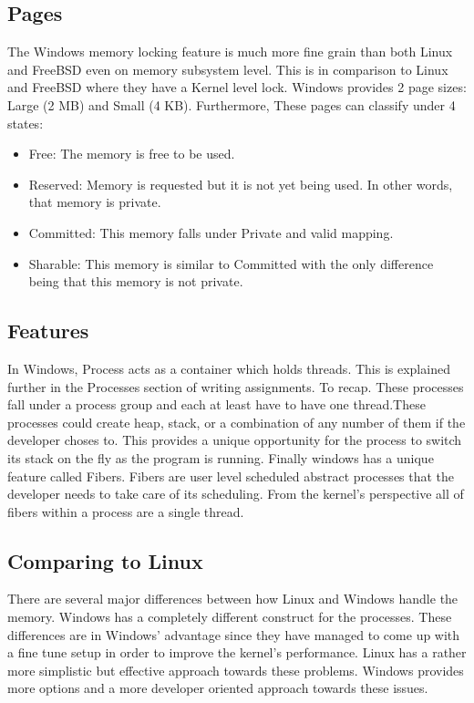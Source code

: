 \documentclass[journal,10pt,onecolumn,compsoc,letterpaper,draftclsnofoot,table,xcdraw]{IEEEtran} \usepackage[margin=0.75in]{geometry}
\begin{document}
\subsection{Pages}
\noindent The Windows memory locking feature is much more fine grain than both Linux and FreeBSD even on memory subsystem level. This is in comparison to Linux and FreeBSD where they have a Kernel level lock. Windows provides 2 page sizes: Large (2 MB) and Small (4 KB). Furthermore, These pages can classify under 4 states:
\begin{itemize}
\item Free: The memory is free to be used.
\item Reserved: Memory is requested but it is not yet being used. In other words, that memory is private.
\item Committed: This memory falls under Private and valid mapping.
\item Sharable: This memory is similar to Committed with the only difference being that this memory is not private.
\end{itemize}
\subsection{Features}
\noindent In Windows, Process acts as a container which holds threads. This is explained further in the Processes section of writing assignments. To recap. These processes fall under a process group and each at least have to have one thread.These processes could create heap, stack, or a combination of any number of them if the developer choses to. This provides a unique opportunity for the process to switch its stack on the fly as the program is running. Finally windows has a unique feature called Fibers. Fibers are user level scheduled abstract processes that the developer needs to take care of its scheduling. From the kernel's perspective all of fibers within a process are a single thread.
\subsection{Comparing to Linux}
\noindent There are several major differences between how Linux and Windows handle the memory. Windows has a completely different construct for the processes. These differences are in Windows' advantage since they have managed to come up with a fine tune setup in order to improve the kernel's performance. Linux has a rather more simplistic but effective approach towards these problems. Windows provides more options and a more developer oriented approach towards these issues.
\end{document}
